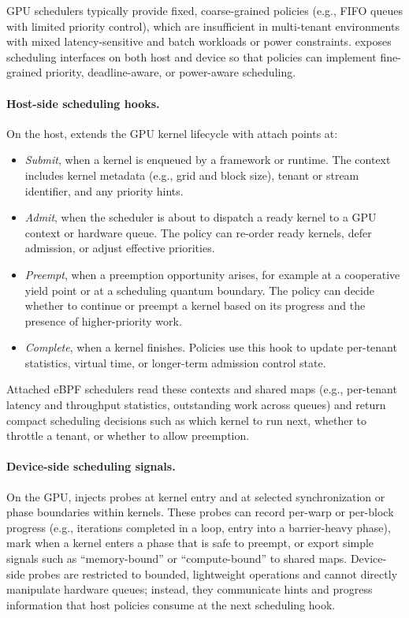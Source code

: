 GPU schedulers typically provide fixed, coarse-grained policies (e.g., FIFO queues
with limited priority control), which are insufficient in multi-tenant environments
with mixed latency-sensitive and batch workloads or power constraints. \sys exposes
scheduling interfaces on both host and device so that policies can implement
fine-grained priority, deadline-aware, or power-aware scheduling.

\paragraph{Host-side scheduling hooks.}
On the host, \sys extends the GPU kernel lifecycle with attach points at:

\begin{itemize}[leftmargin=*]
  \item \emph{Submit}, when a kernel is enqueued by a framework or runtime. The
        context includes kernel metadata (e.g., grid and block size), tenant or
        stream identifier, and any priority hints.
  \item \emph{Admit}, when the scheduler is about to dispatch a ready kernel to
        a GPU context or hardware queue. The policy can re-order ready kernels,
        defer admission, or adjust effective priorities.
  \item \emph{Preempt}, when a preemption opportunity arises, for example at a
        cooperative yield point or at a scheduling quantum boundary. The policy
        can decide whether to continue or preempt a kernel based on its progress
        and the presence of higher-priority work.
  \item \emph{Complete}, when a kernel finishes. Policies use this hook to update
        per-tenant statistics, virtual time, or longer-term admission control state.
\end{itemize}

Attached eBPF schedulers read these contexts and shared maps (e.g., per-tenant
latency and throughput statistics, outstanding work across queues) and return
compact scheduling decisions such as which kernel to run next, whether to throttle
a tenant, or whether to allow preemption.

\paragraph{Device-side scheduling signals.}
On the GPU, \sys injects probes at kernel entry and at selected synchronization or
phase boundaries within kernels. These probes can record per-warp or per-block
progress (e.g., iterations completed in a loop, entry into a barrier-heavy phase),
mark when a kernel enters a phase that is safe to preempt, or export simple signals
such as ``memory-bound'' or ``compute-bound'' to shared maps. Device-side probes
are restricted to bounded, lightweight operations and cannot directly manipulate
hardware queues; instead, they communicate hints and progress information that host
policies consume at the next scheduling hook.

